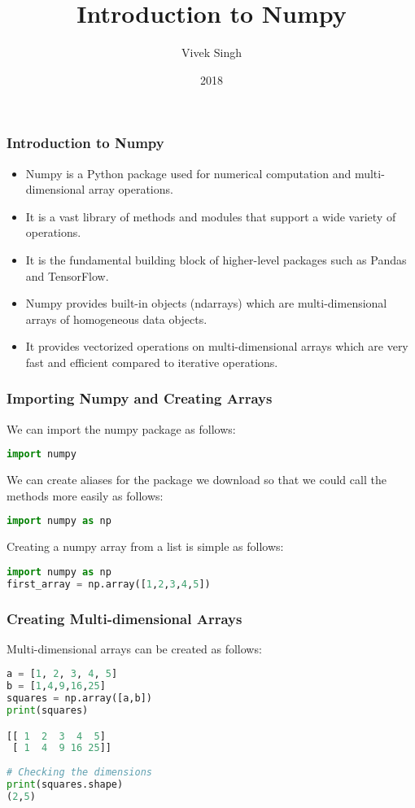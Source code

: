 \documentclass{beamer}
\title{Introduction to Numpy}
\author{Vivek Singh}
\institute{Information Systems Decision Sciences (ISDS)\\
MUMA College of Business\\
University of South Florida \\
Tampa, Florida}
\date{2018}
\begin{document}
\frame{\titlepage}
\begin{frame}
\frametitle{Introduction to Numpy}
\begin{itemize}
\item Numpy is a Python package used for numerical computation and multi-dimensional array operations.
\item It is a vast library of methods and modules that support a wide variety of operations.
\item It is the  fundamental building block of higher-level packages such as Pandas and TensorFlow.
\item Numpy provides built-in objects (ndarrays) which are multi-dimensional arrays of homogeneous data objects.
\item It provides vectorized operations on multi-dimensional arrays which are very fast and efficient compared to iterative  operations.
\end{itemize}
\end{frame}

\begin{frame}[fragile]
\frametitle{Importing Numpy and Creating Arrays}
We can import the numpy package as follows: \\
\begin{lstlisting}[language=Python]
import numpy
\end{lstlisting}
We can create aliases for the package we download so that we could call the methods more easily as follows:
\begin{lstlisting}[language=Python]
import numpy as np
\end{lstlisting}
Creating a numpy array from a list is simple as follows:
\begin{lstlisting}[language=Python]
import numpy as np
first_array = np.array([1,2,3,4,5])
\end{lstlisting}
\end{frame}

\begin{frame}[fragile]
\frametitle{Creating Multi-dimensional Arrays}
Multi-dimensional arrays can be created as follows:
\begin{lstlisting}[language=Python]
a = [1, 2, 3, 4, 5]
b = [1,4,9,16,25]
squares = np.array([a,b])
print(squares)

[[ 1  2  3  4  5]
 [ 1  4  9 16 25]]
 
# Checking the dimensions
print(squares.shape)
(2,5)
\end{lstlisting}
\end{frame}
\end{document}
